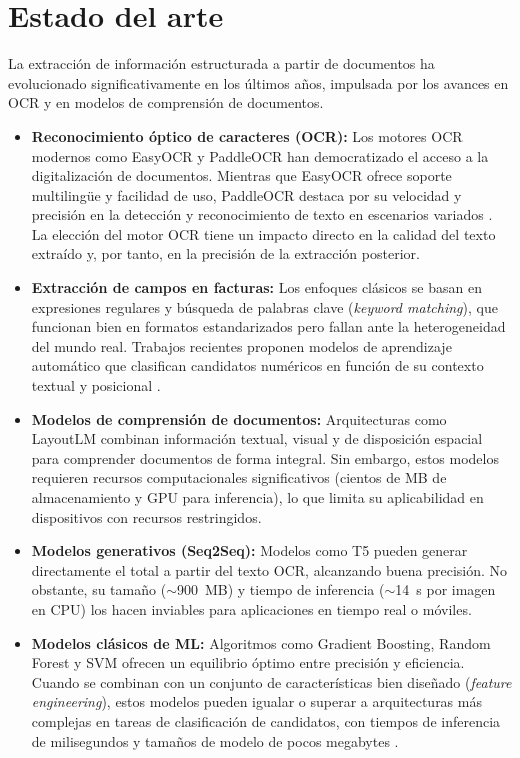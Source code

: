 \section{Estado del arte}
\label{sec:estado_arte}

La extracción de información estructurada a partir de documentos ha evolucionado significativamente en los últimos años, impulsada por los avances en OCR y en modelos de comprensión de documentos.

\begin{itemize}
    \item \textbf{Reconocimiento óptico de caracteres (OCR):} Los motores OCR modernos como EasyOCR y PaddleOCR han democratizado el acceso a la digitalización de documentos. Mientras que EasyOCR ofrece soporte multilingüe y facilidad de uso, PaddleOCR destaca por su velocidad y precisión en la detección y reconocimiento de texto en escenarios variados \cite{kumar2020extraction}. La elección del motor OCR tiene un impacto directo en la calidad del texto extraído y, por tanto, en la precisión de la extracción posterior.

    \item \textbf{Extracción de campos en facturas:} Los enfoques clásicos se basan en expresiones regulares y búsqueda de palabras clave (\textit{keyword matching}), que funcionan bien en formatos estandarizados pero fallan ante la heterogeneidad del mundo real. Trabajos recientes proponen modelos de aprendizaje automático que clasifican candidatos numéricos en función de su contexto textual y posicional \cite{gunaydin2023digitization, saout2024overview}.

    \item \textbf{Modelos de comprensión de documentos:} Arquitecturas como LayoutLM \cite{xu2020layoutlm} combinan información textual, visual y de disposición espacial para comprender documentos de forma integral. Sin embargo, estos modelos requieren recursos computacionales significativos (cientos de MB de almacenamiento y GPU para inferencia), lo que limita su aplicabilidad en dispositivos con recursos restringidos.

    \item \textbf{Modelos generativos (Seq2Seq):} Modelos como T5 pueden generar directamente el total a partir del texto OCR, alcanzando buena precisión. No obstante, su tamaño ($\sim$900~MB) y tiempo de inferencia ($\sim$14~s por imagen en CPU) los hacen inviables para aplicaciones en tiempo real o móviles.

    \item \textbf{Modelos clásicos de ML:} Algoritmos como Gradient Boosting, Random Forest y SVM ofrecen un equilibrio óptimo entre precisión y eficiencia. Cuando se combinan con un conjunto de características bien diseñado (\textit{feature engineering}), estos modelos pueden igualar o superar a arquitecturas más complejas en tareas de clasificación de candidatos, con tiempos de inferencia de milisegundos y tamaños de modelo de pocos megabytes \cite{saout2024overview}.
\end{itemize}
